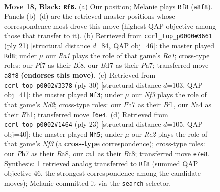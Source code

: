 \documentclass[11pt]{article}
\begin{document}
\clearpage

\begin{figure}[p]\centering
\begin{subfigure}{0.46\textwidth}\centering
\resizebox{\linewidth}{!}{%
\newchessgame
\chessboard[
  setfen={r5k1/3brppp/4pn2/p1pq4/n7/4P1P1/PP2BRPP/RNQ1N1K1 b - - 1 18},
  showmover=false,
  pgfstyle=straightmove, color=movearrow, markmove={a8-f8}
]}
\caption{}
\end{subfigure}\hfill
\begin{subfigure}{0.46\textwidth}\centering
\resizebox{\linewidth}{!}{%
\newchessgame
\chessboard[
  setfen={r3kb1r/pp3ppp/2nnq3/4p3/2P5/1P3N2/PB3PPP/RN1Q1RK1 b kq - 0 11},
  showmover=false,
  pgfstyle=straightmove, color=movearrow, markmove={a8-d8}
]}
\caption{}
\end{subfigure}
\\[4pt]
\begin{subfigure}{0.46\textwidth}\centering
\resizebox{\linewidth}{!}{%
\newchessgame
\chessboard[
  setfen={r5k1/ppp2p1p/2nr1qp1/5b2/2P5/PQ2P1P1/1P1N1PP1/2R1KB1R w K - 1 16},
  showmover=false,
  pgfstyle=straightmove, color=movearrow, markmove={d2-f3}
]}
\caption{}
\end{subfigure}\hfill
\begin{subfigure}{0.46\textwidth}\centering
\resizebox{\linewidth}{!}{%
\newchessgame
\chessboard[
  setfen={r1b1k2r/ppp1q1pp/2n1pn2/3p4/3P4/2N3QN/PPP2PP1/2KR1B1R b kq - 3 12},
  showmover=false,
  pgfstyle=straightmove, color=movearrow, markmove={f6-h5}
]}
\caption{}
\end{subfigure}
\caption{\textbf{Move 18, Black: \texttt{Rf8}.} (a) Our position; Melanie plays \texttt{Rf8} (\texttt{a8f8}). Panels (b)--(d) are the retrieved master positions whose correspondence most drove this move (highest QAP objective among those that transfer to it). (b) Retrieved from \texttt{ccrl\_top\_p0000\#3661} (ply 21) [structural distance $d$=84, QAP obj=46]: the master played \texttt{Rd8}; under $\mu$ our \emph{Ra1} plays the role of that game's \emph{Ra1}; cross-type roles: our \emph{P}f7 as their \emph{B}f8, our \emph{B}d7 as their \emph{P}a7; transferred move \texttt{a8f8} \textbf{(endorses this move)}. (c) Retrieved from \texttt{ccrl\_top\_p0002\#3378} (ply 30) [structural distance $d$=103, QAP obj=41]: the master played \texttt{Nf3}; under $\mu$ our \emph{Nf3} plays the role of that game's \emph{Nd2}; cross-type roles: our \emph{P}h7 as their \emph{B}f1, our \emph{N}a4 as their \emph{R}h1; transferred move \texttt{f6e4}. (d) Retrieved from \texttt{ccrl\_top\_p0002\#1464} (ply 23) [structural distance $d$=105, QAP obj=40]: the master played \texttt{Nh5}; under $\mu$ our \emph{Re2} plays the role of that game's \emph{Nf3} (a \textbf{cross-type} correspondence); cross-type roles: our \emph{P}h7 as their \emph{R}a8, our \emph{r}a1 as their \emph{B}c8; transferred move \texttt{e7e8}. Synthesis: 1 retrieved analog transferred to \texttt{Rf8} (summed QAP objective 46, the strongest correspondence among the candidate moves); Melanie committed it via the \texttt{search} selector.}
\label{fig:thought-m35}
\end{figure}
\end{document}
